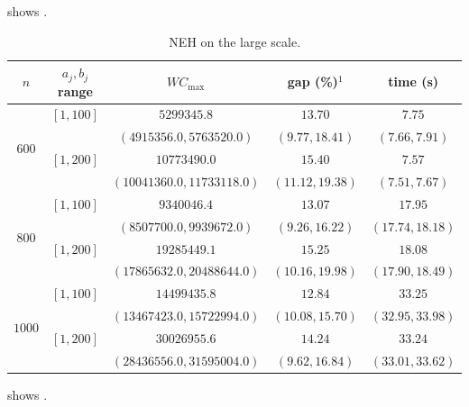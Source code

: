 \documentclass[12pt]{article}
\newlength{\resultstabwidth}
\newcommand{\resultstable}{%
    \centering
    \footnotesize
    \setlength{\tabcolsep}{4pt}%
    \renewcommand{\arraystretch}{1.15}}
\begin{document}
\begin{sloppypar}
 shows \TBD.

\begin{table}[H]
\resultstable
\caption{NEH on the large scale.}
\label{tab:results-large-neh}
\begin{tabular*}{\resultstabwidth}{@{\extracolsep{\fill}}ccccc@{}}
\toprule
$n$ & $a_j,b_j$ range & $W C_{\max}$ & gap (\%)$^{1}$ & time (s) \\
\midrule
\multirow{4}{*}{$600$} & $[1,100]$ & $5299345.8$ & $13.70$ & $7.75$ \\
                        &           & $(4915356.0, 5763520.0)$ & $(9.77, 18.41)$ & $(7.66, 7.91)$ \\
                        & $[1,200]$ & $10773490.0$ & $15.40$ & $7.57$ \\
                        &           & $(10041360.0, 11733118.0)$ & $(11.12, 19.38)$ & $(7.51, 7.67)$ \\
\midrule
\multirow{4}{*}{$800$} & $[1,100]$ & $9340046.4$ & $13.07$ & $17.95$ \\
                        &           & $(8507700.0, 9939672.0)$ & $(9.26, 16.22)$ & $(17.74, 18.18)$ \\
                        & $[1,200]$ & $19285449.1$ & $15.25$ & $18.08$ \\
                        &           & $(17865632.0, 20488644.0)$ & $(10.16, 19.98)$ & $(17.90, 18.49)$ \\
\midrule
\multirow{4}{*}{$1000$} & $[1,100]$ & $14499435.8$ & $12.84$ & $33.25$ \\
                        &           & $(13467423.0, 15722994.0)$ & $(10.08, 15.70)$ & $(32.95, 33.98)$ \\
                        & $[1,200]$ & $30026955.6$ & $14.24$ & $33.24$ \\
                        &           & $(28436556.0, 31595004.0)$ & $(9.62, 16.84)$ & $(33.01, 33.62)$ \\
\bottomrule
\end{tabular*}
\end{table}

 shows \TBD.


\end{sloppypar}
\end{document}
